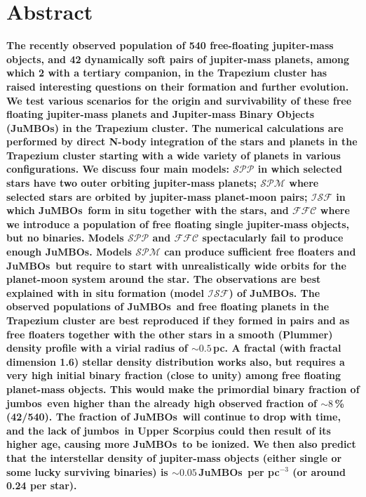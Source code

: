 \documentclass[submission,phys]{lib/SciPost}
\newcommand{\jumbos}{\mbox{JuMBOs}}
\begin{document}
\section*{Abstract} {\bf 
      The recently observed population of 540 free-floating
      jupiter-mass objects, and 42 dynamically soft pairs of
      jupiter-mass planets, among which 2 with a tertiary companion,
      in the Trapezium cluster has raised interesting questions on
      their formation and further evolution.  We test various
      scenarios for the origin and survivability of these free
      floating jupiter-mass planets and Jupiter-mass Binary Objects
      (JuMBOs) in the Trapezium cluster.  The numerical calculations
      are performed by direct N-body integration of the stars and
      planets in the Trapezium cluster starting with a wide variety of
      planets in various configurations. We discuss four main models:
      $\mathcal{SPP}$ in which selected stars have two outer orbiting
      jupiter-mass planets; $\mathcal{SPM}$ where selected stars are
      orbited by jupiter-mass planet-moon pairs; $\mathcal{ISF}$ in
      which \jumbos\, form in situ together with the stars, and
      $\mathcal{FFC}$ where we introduce a population of free floating
      single jupiter-mass objects, but no binaries.  Models
      $\mathcal{SPP}$ and $\mathcal{FFC}$ spectacularly fail to
      produce enough \jumbos. Models $\mathcal{SPM}$ can produce
      sufficient free floaters and \jumbos\, but require to start with
      unrealistically wide orbits for the planet-moon system around
      the star.  The observations are best explained with in situ
      formation (model $\mathcal{ISF}$) of \jumbos.  The observed
      populations of \jumbos\, and free floating planets in the
      Trapezium cluster are best reproduced if they formed in pairs
      and as free floaters together with the other stars in a smooth
      (Plummer) density profile with a virial radius of $\sim
      0.5$\,pc.  A fractal (with fractal dimension 1.6) stellar
      density distribution works also, but requires a very high
      initial binary fraction (close to unity) among free floating
      planet-mass objects.  This would make the primordial binary
      fraction of jumbos\, even higher than the already high observed
      fraction of $\sim 8$\,\% (42/540). The fraction of \jumbos\,
      will continue to drop with time, and the lack of jumbos\, in
      Upper Scorpius could then result of its higher age, causing more
      \jumbos\, to be ionized. We then also predict that the
      interstellar density of jupiter-mass objects (either single or
      some lucky surviving binaries) is $\sim 0.05$\,\jumbos\, per
      pc$^{-3}$ (or around 0.24 per star).  }
   
\end{document}
